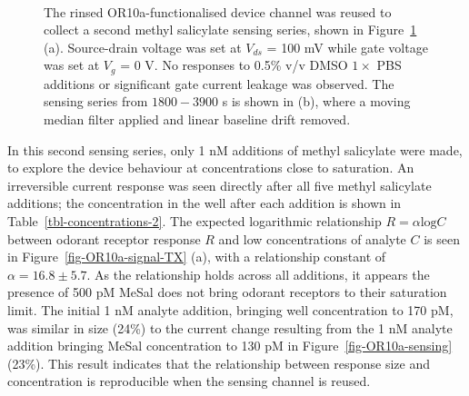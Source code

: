 \documentclass[
  a4paper,
]{scrbook}
\begin{document}
\begin{figure}
\begin{minipage}[t]{0.70\linewidth}
{{}

}

\end{minipage}%
%
\begin{minipage}[t]{0.15\linewidth}

{\centering 

~

}

\end{minipage}%

\caption[A second methyl salicylate sensing series performed using the
rinsed OR10a-functionalised device channel, alongside the same series
filtered and with baseline drift
removed.]{\label{fig-OR10a-responses}The rinsed OR10a-functionalised
device channel was reused to collect a second methyl salicylate sensing
series, shown in Figure~\ref{fig-OR10a-responses} (a). Source-drain
voltage was set at \(V_{ds}\) = 100 mV while gate voltage was set at
\(V_g\) = 0 V. No responses to 0.5\% v/v DMSO \(1 \times\) PBS additions
or significant gate current leakage was observed. The sensing series
from \(1800-3900\) s is shown in (b), where a moving median filter
applied and linear baseline drift removed.}

\end{figure}

In this second sensing series, only 1 nM additions of methyl salicylate
were made, to explore the device behaviour at concentrations close to
saturation. An irreversible current response was seen directly after all
five methyl salicylate additions; the concentration in the well after
each addition is shown in Table~\ref{tbl-concentrations-2}. The expected
logarithmic relationship \(R = \alpha\textrm{log}C\) between odorant
receptor response \(R\) and low concentrations of analyte \(C\) is seen
in Figure~\ref{fig-OR10a-signal-TX} (a), with a relationship constant of
\(\alpha = 16.8 \pm 5.7\). As the relationship holds across all
additions, it appears the presence of 500 pM MeSal does not bring
odorant receptors to their saturation limit. The initial 1 nM analyte
addition, bringing well concentration to 170 pM, was similar in size
(24\%) to the current change resulting from the 1 nM analyte addition
bringing MeSal concentration to 130 pM in Figure~\ref{fig-OR10a-sensing}
(23\%). This result indicates that the relationship between response
size and concentration is reproducible when the sensing channel is
reused.
\end{document}
